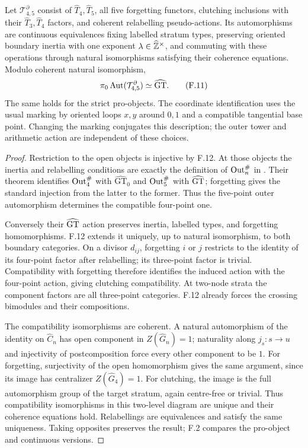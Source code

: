 Let $\mathcal T^{\partial}_{4,5}$ consist of $\widehat T_4,\widehat T_5$, all five forgetting functors, clutching inclusions with their $\widehat T_3,\widehat T_4$ factors, and coherent relabelling pseudo-actions. Its automorphisms are continuous equivalences fixing labelled stratum types, preserving oriented boundary inertia with one exponent $\lambda\in\widehat{\mathbb Z}^\times$, and commuting with these operations through natural isomorphisms satisfying their coherence equations. Modulo coherent natural isomorphism,
\[
 \pi_0\operatorname{Aut}(\mathcal T^{\partial}_{4,5})\simeq\widehat{\mathrm{GT}}.             \tag{F.11}
\]
The same holds for the strict pro-objects. The coordinate identification uses the usual marking by oriented loops $x,y$ around $0,1$ and a compatible tangential base point. Changing the marking conjugates this description; the outer tower and arithmetic action are independent of these choices.
\begin{proof}
Restriction to the open objects is injective by F.12. At those objects the inertia and relabelling conditions are exactly the definition of $\operatorname{Out}_n^\#$ in \citet[definition in the introduction and Main Theorem]{HarbaterSchneps2000}. Their theorem identifies $\operatorname{Out}_4^\#$ with $\widehat{\mathrm{GT}}_0$ and $\operatorname{Out}_5^\#$ with $\widehat{\mathrm{GT}}$; forgetting gives the standard injection from the latter to the former. Thus the five-point outer automorphism determines the compatible four-point one.

Conversely their $\widehat{\mathrm{GT}}$ action preserves inertia, labelled types, and forgetting homomorphisms. F.12 extends it uniquely, up to natural isomorphism, to both boundary categories. On a divisor $d_{ij}$, forgetting $i$ or $j$ restricts to the identity of its four-point factor after relabelling; its three-point factor is trivial. Compatibility with forgetting therefore identifies the induced action with the four-point action, giving clutching compatibility. At two-node strata the component factors are all three-point categories. F.12 already forces the crossing bimodules and their compositions.

The compatibility isomorphisms are coherent. A natural automorphism of the identity on $\widehat C_n$ has open component in $Z(\widehat G_n)=1$; naturality along $j_s:s\to u$ and injectivity of postcomposition force every other component to be $1$. For forgetting, surjectivity of the open homomorphism gives the same argument, since its image has centralizer $Z(\widehat G_4)=1$. For clutching, the image is the full automorphism group of the target stratum, again centre-free or trivial. Thus compatibility isomorphisms in this two-level diagram are unique and their coherence equations hold. Relabellings are equivalences and satisfy the same uniqueness. Taking opposites preserves the result; F.2 compares the pro-object and continuous versions.
\end{proof}

